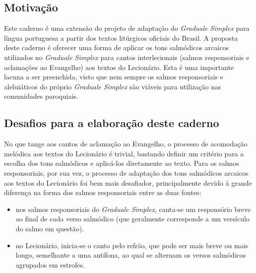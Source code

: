 \newcommand{\GR}{\emph{Graduale Romanum}}
\newcommand{\GS}{\emph{Graduale Simplex}}
\newcommand{\KS}{\emph{Kyriale Simplex}}
\newcommand{\Al}{\emph{Allelúia}}
\newcommand{\Schola}{\emph{schola}}
\newcommand{\ScholaC}{\emph{schola cantorum}}
\newcommand{\FirstPara}[1]{\noindent\textcolor{gregoriocolor}{#1.}}
\newcommand{\Para}[1]{\vspace{\baselineskip}\noindent\textcolor{gregoriocolor}{#1.}}



\subsection{Motivação}

Este caderno é uma extensão do projeto de adaptação do {\GS} para língua portuguesa a partir dos textos litúrgicos oficiais do Brasil. A proposta deste caderno é oferecer uma forma de aplicar os tons salmódicos arcaicos utilizados no {\GS} para cantos interlecionais (salmos responsoriais e aclamações ao Evangelho) aos textos do Lecionário. Esta é uma importante lacuna a ser preenchida, visto que nem sempre os salmos responsoriais e aleluiáticos do próprio {\GS} são viáveis para utilização nas comunidades paroquiais.

\subsection{Desafios para a elaboração deste caderno}

No que tange aos cantos de aclamação ao Evangelho, o processo de acomodação melódica aos textos do Lecionário é trivial, bastando definir um critério para a escolha dos tons salmódicos e aplicá-los diretamente ao texto. Para os salmos responsoriais, por sua vez, o processo de adaptação dos tons salmódicos arcaicos aos textos do Lecionário foi bem mais desafiador, principalmente devido à grande diferença na forma dos salmos responsoriais entre as duas fontes:
\begin{itemize}
    \item nos salmos responsoriais do {\GS}, canta-se um responsório breve ao final de cada verso salmódico (que geralmente corresponde a um versículo do salmo em questão).
    \item no Lecionário, inicia-se o canto pelo refrão, que pode ser mais breve ou mais longo, semelhante a uma antífona, ao qual se alternam os versos salmódicos agrupados em estrofes.
\end{itemize}

